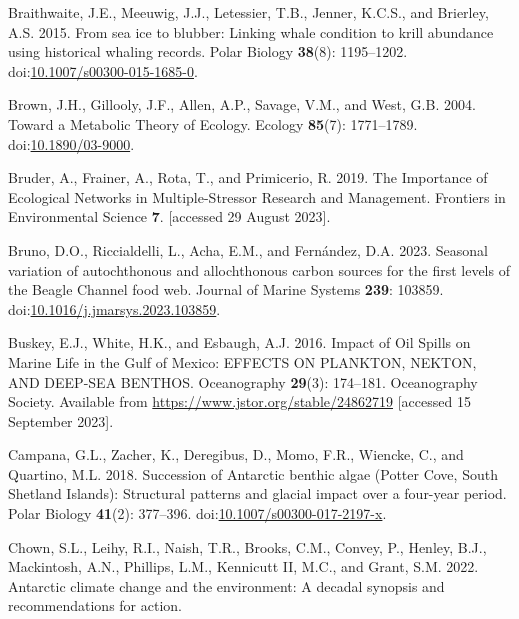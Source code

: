 \documentclass[
]{article}
\newlength{\cslhangindent}
\newenvironment{CSLReferences}[2] %
 {\begin{list}{}{%
  \setlength{\itemindent}{0pt}
  \setlength{\leftmargin}{0pt}
  \setlength{\parsep}{0pt}
  \ifodd #1
   \setlength{\leftmargin}{\cslhangindent}
   \setlength{\itemindent}{-1\cslhangindent}
  \fi
  \setlength{\itemsep}{#2\baselineskip}}}
 {\end{list}}
\begin{document}
\begin{CSLReferences}{1}{0}
Braithwaite, J.E., Meeuwig, J.J., Letessier, T.B., Jenner, K.C.S., and
Brierley, A.S. 2015. From sea ice to blubber: Linking whale condition to
krill abundance using historical whaling records. Polar Biology
\textbf{38}(8): 1195--1202.
doi:\href{https://doi.org/10.1007/s00300-015-1685-0}{10.1007/s00300-015-1685-0}.

Brown, J.H., Gillooly, J.F., Allen, A.P., Savage, V.M., and West, G.B.
2004. Toward a {Metabolic Theory} of {Ecology}. Ecology \textbf{85}(7):
1771--1789. doi:\href{https://doi.org/10.1890/03-9000}{10.1890/03-9000}.

Bruder, A., Frainer, A., Rota, T., and Primicerio, R. 2019. The
{Importance} of {Ecological Networks} in {Multiple-Stressor Research}
and {Management}. Frontiers in Environmental Science \textbf{7}.
{[}accessed 29 August 2023{]}.

Bruno, D.O., Riccialdelli, L., Acha, E.M., and Fernández, D.A. 2023.
Seasonal variation of autochthonous and allochthonous carbon sources for
the first levels of the {Beagle Channel} food web. Journal of Marine
Systems \textbf{239}: 103859.
doi:\href{https://doi.org/10.1016/j.jmarsys.2023.103859}{10.1016/j.jmarsys.2023.103859}.

Buskey, E.J., White, H.K., and Esbaugh, A.J. 2016. Impact of {Oil
Spills} on {Marine Life} in the {Gulf} of {Mexico}: {EFFECTS ON
PLANKTON}, {NEKTON}, {AND DEEP-SEA BENTHOS}. Oceanography
\textbf{29}(3): 174--181. Oceanography Society. Available from
\url{https://www.jstor.org/stable/24862719} {[}accessed 15 September
2023{]}.

Campana, G.L., Zacher, K., Deregibus, D., Momo, F.R., Wiencke, C., and
Quartino, M.L. 2018. Succession of {Antarctic} benthic algae ({Potter
Cove}, {South Shetland Islands}): Structural patterns and glacial impact
over a four-year period. Polar Biology \textbf{41}(2): 377--396.
doi:\href{https://doi.org/10.1007/s00300-017-2197-x}{10.1007/s00300-017-2197-x}.

Chown, S.L., Leihy, R.I., Naish, T.R., Brooks, C.M., Convey, P., Henley,
B.J., Mackintosh, A.N., Phillips, L.M., Kennicutt II, M.C., and Grant,
S.M. 2022. Antarctic climate change and the environment: A decadal
synopsis and recommendations for action.


\end{CSLReferences}
\end{document}
